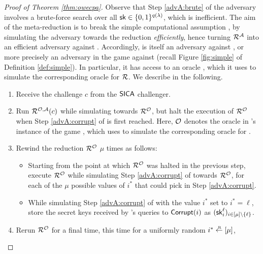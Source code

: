 \begin{proof}[Proof of Theorem \ref{thm:owecpa}]
  Observe that Step \ref{advA:brute} of the adversary \advA involves a brute-force search
  over all \(\mathsf{sk} \in \{0,1\}^{q(\lambda)}\), which is inefficient.
  The aim of the meta-reduction \redM is to break the simple computational assumption \Simple,
  by simulating the adversary \advA towards the reduction \redR \emph{efficiently},
  hence turning \(\redR^{\advA}\) into an efficient adversary against \Simple.
  Accordingly, \redM is itself an adversary against \Simple,
  or more precisely an adversary in the game \SICA against \Simple
  (recall Figure \ref{fig:simple} of Definition \ref{def:simple}).
  In particular, it has access to an oracle \oracle,
  which it uses to simulate the corresponding oracle for \(\redR\).
  We describe \redM in the following.

  \begin{enumerate}[itemsep=0.1cm]
    \item Receive the challenge \(c\) from the \(\mathsf{SICA}\) challenger.
    \item Run \(\redR^{\oracle,\advA}(c)\) while simulating \advA towards \(\redR^{\oracle}\),
          but halt the execution of \(\redR^{\oracle}\) when Step \ref{advA:corrupt} of \advA
          is first reached.
          Here, \(\mathcal{O}\) denotes the oracle in \redM's instance of the game \SICA,
          which \redM uses to simulate the corresponding oracle for \redR.
    \item\label{advM:rewind}
          Rewind the reduction \(\redR^{\oracle}\) \(\mu\) times as follows:
          \begin{itemize}[label={\textbullet},itemsep=0.1cm]
            \item Starting from the point at which \(\redR^{\oracle}\) was halted in
                  the previous step, execute \(\redR^{\oracle}\) while simulating Step
                  \ref{advA:corrupt} of \advA towards \(\redR^{\oracle}\),
                  for each of the \(\mu\) possible values of \(i^{*}\)
                  that \advA could pick in Step \ref{advA:corrupt}.
            \item While simulating Step \ref{advA:corrupt} of \advA
                  with the value \(i^{*}\) set to \(i^{*} = \ell\),
                  store the secret keys received by \advA's queries to \(\mathsf{Corrupt}(i)\)
                  as \((\mathsf{sk}_{i}^{\ell})_{i \in [\mu] \setminus \{\ell\}}\).
          \end{itemize}
    \item\label{advM:sample} Rerun \(\redR^{\oracle}\) for a final time, this time for a uniformly random \(i^{*} \sampleR [\mu]\),

\end{enumerate}
\end{proof}
